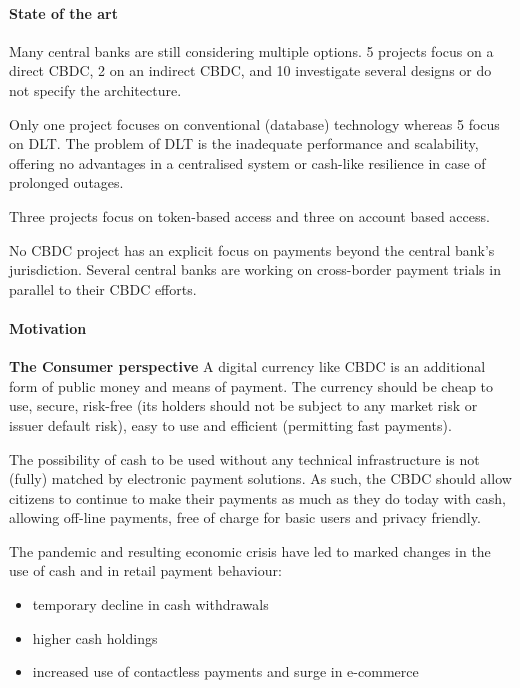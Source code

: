 
\paragraph{State of the art}

Many central banks are still considering multiple options.
5 projects focus on a direct CBDC, 2 on an indirect CBDC, and 10 investigate several designs or do not specify the architecture.

Only one project focuses on conventional (database) technology whereas 5 focus on DLT.
The problem of DLT is the inadequate performance and scalability, offering no advantages in a centralised system or cash-like resilience in case of prolonged outages.

Three projects focus on token-based access and three on account based access.

No CBDC project has an explicit focus on payments beyond the central bank's jurisdiction. Several central banks are working on cross-border payment trials in parallel to their CBDC efforts.

\paragraph{Motivation}

\textbf{The Consumer perspective}
A digital currency like CBDC is an additional form of public money and means of payment. The currency should be cheap to use, secure, risk-free (its holders should not be subject to any market risk or issuer default risk), easy to use and efficient (permitting fast payments).

The possibility of cash to be used without any technical infrastructure is not (fully) matched by electronic payment solutions. As such, the CBDC should allow citizens to continue to make their payments as much as they do today with cash, allowing off-line payments, free of charge for basic users and privacy friendly.

The pandemic and resulting economic crisis have led to marked changes in the use of cash and in retail payment behaviour:
\begin{itemize}
    \item temporary decline in cash withdrawals
    \item higher cash holdings
    \item increased use of contactless payments and surge in e-commerce
\end{itemize}

